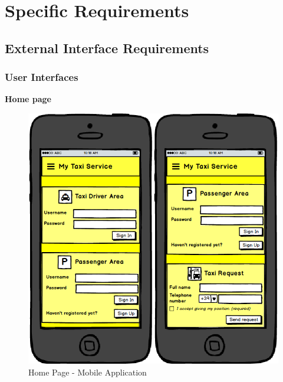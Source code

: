\section{Specific Requirements}
	\subsection{External Interface Requirements}
		\subsubsection{User Interfaces}
		\begin{description}
			\item{\textbf{Home page}}
			\begin{figure}[!h]
				\centering					
				\includegraphics[scale=0.5]{../SE2_MOCKUPS/MobileAppHomePage.png}
				\caption{Home Page - Mobile Application}	
			\end{figure}
		\end{description}
		
		\newpage
